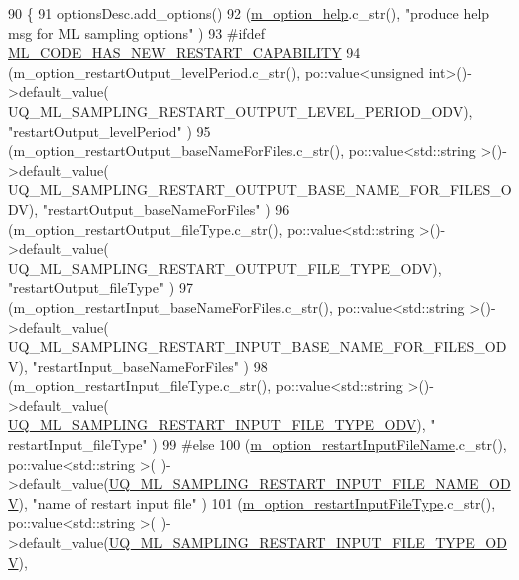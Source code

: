 \begin{DoxyCode}
90 \{
91   optionsDesc.add\_options()     
92     (\hyperlink{class_q_u_e_s_o_1_1_m_l_sampling_options_a5239a6e156de70d1f64b90e5885556d5}{m\_option\_help}.c\_str(),                                                                   
                                                               \textcolor{stringliteral}{"produce help msg for ML sampling options"}      )
93 #ifdef \hyperlink{_defines_8h_aad80372764e15a7ed434e7ad41ac27b2}{ML\_CODE\_HAS\_NEW\_RESTART\_CAPABILITY}
94     (m\_option\_restartOutput\_levelPeriod.c\_str(),      po::value<unsigned int>()->default\_value(
      UQ\_ML\_SAMPLING\_RESTART\_OUTPUT\_LEVEL\_PERIOD\_ODV),        \textcolor{stringliteral}{"restartOutput\_levelPeriod"}                     )
95     (m\_option\_restartOutput\_baseNameForFiles.c\_str(), po::value<std::string >()->default\_value(
      UQ\_ML\_SAMPLING\_RESTART\_OUTPUT\_BASE\_NAME\_FOR\_FILES\_ODV), \textcolor{stringliteral}{"restartOutput\_baseNameForFiles"}                )
96     (m\_option\_restartOutput\_fileType.c\_str(),         po::value<std::string >()->default\_value(
      UQ\_ML\_SAMPLING\_RESTART\_OUTPUT\_FILE\_TYPE\_ODV),           \textcolor{stringliteral}{"restartOutput\_fileType"}                        )
97     (m\_option\_restartInput\_baseNameForFiles.c\_str(),  po::value<std::string >()->default\_value(
      UQ\_ML\_SAMPLING\_RESTART\_INPUT\_BASE\_NAME\_FOR\_FILES\_ODV),  \textcolor{stringliteral}{"restartInput\_baseNameForFiles"}                 )
98     (m\_option\_restartInput\_fileType.c\_str(),          po::value<std::string >()->default\_value(
      \hyperlink{_m_l_sampling_options_8h_a018a972ab4b4e38509e010f4b3223fb1}{UQ\_ML\_SAMPLING\_RESTART\_INPUT\_FILE\_TYPE\_ODV}),            \textcolor{stringliteral}{"
      restartInput\_fileType"}                         )
99 #\textcolor{keywordflow}{else}
100     (\hyperlink{class_q_u_e_s_o_1_1_m_l_sampling_options_a0fbc7946acb9944500d92503a1a0feaf}{m\_option\_restartInputFileName}.c\_str(),           po::value<std::string >(
      )->default\_value(\hyperlink{_m_l_sampling_options_8h_a17088af1520e38f78034a6a9d729dff4}{UQ\_ML\_SAMPLING\_RESTART\_INPUT\_FILE\_NAME\_ODV}),     
             \textcolor{stringliteral}{"name of restart input file"}                    )
101     (\hyperlink{class_q_u_e_s_o_1_1_m_l_sampling_options_a3fa31b5691319385226e2149b549e269}{m\_option\_restartInputFileType}.c\_str(),           po::value<std::string >(
      )->default\_value(\hyperlink{_m_l_sampling_options_8h_a018a972ab4b4e38509e010f4b3223fb1}{UQ\_ML\_SAMPLING\_RESTART\_INPUT\_FILE\_TYPE\_ODV}),     

\end{DoxyCode}
